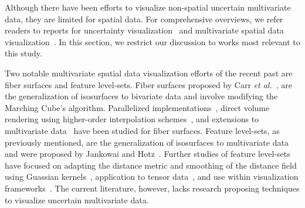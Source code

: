 Although there have been efforts to visualize non-spatial uncertain multivariate data, they are limited for spatial data.
%
For comprehensive overviews, we refer readers to reports for uncertainty visualization~\cite{Bonneau2014,johnson2003next,potter2011quantification} and multivariate spatial data visualization~\cite{he2019multivariate}.
%
In this section, we restrict our discussion to works most relevant to this study.

Two notable multivariate spatial data visualization efforts of the recent past are fiber surfaces and feature level-sets.
%
Fiber surfaces proposed by Carr \textit{et al.}~\cite{carr2015fiber}, are the generalization of isosurfaces to bivariate data and involve modifying the Marching Cube's algorithm.
%
Parallelized implementations~\cite{klacansky2016fast}, direct volume rendering using higher-order interpolation schemes~\cite{wu2016direct}, and extensions to multivariate data~\cite{blecha2020fiber} have been studied for fiber surfaces.  
%
Feature level-sets, as previously mentioned, are the generalization of isosurfaces to multivariate data and were proposed by Jankowai and Hotz~\cite{jankowai2020feature}.
%
Further studies of feature level-sets have focused on adapting the distance metric and smoothing of the distance field using Guassian kernels~\cite{nguyen2020visualization}, application to tensor data~\cite{jankowai2020tensor}, and use within visualization frameworks~\cite{jonsson2020inviwo}.
%
%
The current literature, however, lacks research proposing techniques to visualize uncertain multivariate data.
%


